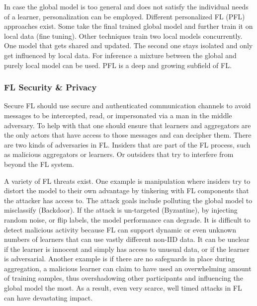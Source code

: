 In case the global model is too general and does not satisfy the individual needs
of a learner, personalization can be employed.
Different personalized FL (PFL) approaches exist.
Some take the final trained global model and further train it on local data (fine tuning).
Other techniques train two local models concurrently.
One model that gets shared and updated.
The second one stays isolated and only get influenced by local data.
For inference a mixture between the global and purely local model can be used.
PFL is a deep and growing subfield of FL.


\subsubsection{FL Security \& Privacy}
Secure FL should use secure and authenticated
communication channels to avoid messages to be intercepted,
read, or impersonated via a man in the middle adversary.
To help with that one should ensure that 
learners and aggregators are the only actors that have
access to those messages and can decipher them.
There are two kinds of adversaries in FL.
Insiders that are part of the FL process, such as
malicious aggregators or learners.
Or outsiders that try to interfere from beyond the FL system.

A variety of FL threats exist.
One example is manipulation where insiders try to distort
the model to their own advantage by tinkering with FL components
that the attacker has access to.
The attack goals include polluting the global model
to misclassify (Backdoor).
If the attack is un-targeted (Byzantine), by injecting random noise,
or flip labels, the model performance can degrade.
It is difficult to detect malicious activity because
FL can support dynamic or even unknown numbers of learners
that can use vastly different non-IID data.
It can be unclear if the learner is innocent and simply has
access to unusual data, or if the learner is adversarial.
Another example is if there are no safeguards in place during aggregation,
a malicious learner can claim to have used an overwhelming amount of training samples,
thus overshadowing other participants and influencing the global model the most.
As a result, even very scarce, well timed attacks in FL can have devastating impact.

